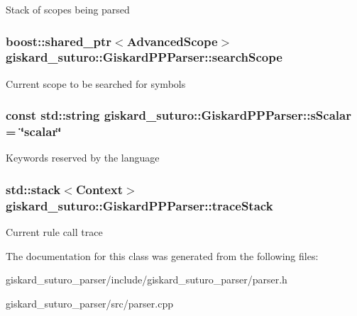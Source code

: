 Stack of scopes being parsed \hypertarget{classgiskard__suturo_1_1GiskardPPParser_a63fc104102b073b0a5f9dfa1fa93eea3}{
\subsubsection[{search\-Scope}]{\setlength{\rightskip}{0pt plus 5cm}boost\-::shared\-\_\-ptr$<${\bf Advanced\-Scope}$>$ giskard\-\_\-suturo\-::\-Giskard\-P\-P\-Parser\-::search\-Scope\hspace{0.3cm}{\ttfamily [private]}}}\label{classgiskard__suturo_1_1GiskardPPParser_a63fc104102b073b0a5f9dfa1fa93eea3}
Current scope to be searched for symbols \hypertarget{classgiskard__suturo_1_1GiskardPPParser_a01e9ef7fa18417e28380b93b91c389b1}{
\subsubsection[{s\-Scalar}]{\setlength{\rightskip}{0pt plus 5cm}const std\-::string giskard\-\_\-suturo\-::\-Giskard\-P\-P\-Parser\-::s\-Scalar = \char`\"{}scalar\char`\"{}\hspace{0.3cm}{\ttfamily [static]}}}\label{classgiskard__suturo_1_1GiskardPPParser_a01e9ef7fa18417e28380b93b91c389b1}
Keywords reserved by the language \hypertarget{classgiskard__suturo_1_1GiskardPPParser_a27bec9e4c3824a46126cce10474b0c97}{
\subsubsection[{trace\-Stack}]{\setlength{\rightskip}{0pt plus 5cm}std\-::stack$<${\bf Context}$>$ giskard\-\_\-suturo\-::\-Giskard\-P\-P\-Parser\-::trace\-Stack\hspace{0.3cm}{\ttfamily [private]}}}\label{classgiskard__suturo_1_1GiskardPPParser_a27bec9e4c3824a46126cce10474b0c97}
Current rule call trace 

The documentation for this class was generated from the following files\-:\begin{DoxyCompactItemize}
\item 
giskard\-\_\-suturo\-\_\-parser/include/giskard\-\_\-suturo\-\_\-parser/parser.\-h\item 
giskard\-\_\-suturo\-\_\-parser/src/parser.\-cpp\end{DoxyCompactItemize}
